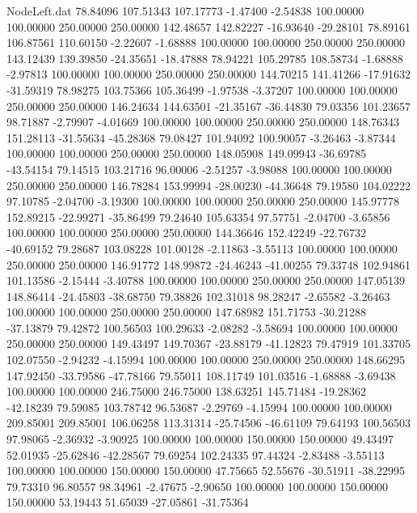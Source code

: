 \begin{filecontents}{NodeLeft.dat}
  78.84096  107.51343  107.17773    -1.47400   -2.54838  100.00000  100.00000  250.00000  250.00000  142.48657  142.82227  -16.93640  -29.28101
  78.89161  106.87561  110.60150    -2.22607   -1.68888  100.00000  100.00000  250.00000  250.00000  143.12439  139.39850  -24.35651  -18.47888
  78.94221  105.29785  108.58734    -1.68888   -2.97813  100.00000  100.00000  250.00000  250.00000  144.70215  141.41266  -17.91632  -31.59319
  78.98275  103.75366  105.36499    -1.97538   -3.37207  100.00000  100.00000  250.00000  250.00000  146.24634  144.63501  -21.35167  -36.44830
  79.03356  101.23657   98.71887    -2.79907   -4.01669  100.00000  100.00000  250.00000  250.00000  148.76343  151.28113  -31.55634  -45.28368
  79.08427  101.94092  100.90057    -3.26463   -3.87344  100.00000  100.00000  250.00000  250.00000  148.05908  149.09943  -36.69785  -43.54154
  79.14515  103.21716   96.00006    -2.51257   -3.98088  100.00000  100.00000  250.00000  250.00000  146.78284  153.99994  -28.00230  -44.36648
  79.19580  104.02222   97.10785    -2.04700   -3.19300  100.00000  100.00000  250.00000  250.00000  145.97778  152.89215  -22.99271  -35.86499
  79.24640  105.63354   97.57751    -2.04700   -3.65856  100.00000  100.00000  250.00000  250.00000  144.36646  152.42249  -22.76732  -40.69152
  79.28687  103.08228  101.00128    -2.11863   -3.55113  100.00000  100.00000  250.00000  250.00000  146.91772  148.99872  -24.46243  -41.00255
  79.33748  102.94861  101.13586    -2.15444   -3.40788  100.00000  100.00000  250.00000  250.00000  147.05139  148.86414  -24.45803  -38.68750
  79.38826  102.31018   98.28247    -2.65582   -3.26463  100.00000  100.00000  250.00000  250.00000  147.68982  151.71753  -30.21288  -37.13879
  79.42872  100.56503  100.29633    -2.08282   -3.58694  100.00000  100.00000  250.00000  250.00000  149.43497  149.70367  -23.88179  -41.12823
  79.47919  101.33705  102.07550    -2.94232   -4.15994  100.00000  100.00000  250.00000  250.00000  148.66295  147.92450  -33.79586  -47.78166
  79.55011  108.11749  101.03516    -1.68888   -3.69438  100.00000  100.00000  246.75000  246.75000  138.63251  145.71484  -19.28362  -42.18239
  79.59085  103.78742   96.53687    -2.29769   -4.15994  100.00000  100.00000  209.85001  209.85001  106.06258  113.31314  -25.74506  -46.61109
  79.64193  100.56503   97.98065    -2.36932   -3.90925  100.00000  100.00000  150.00000  150.00000   49.43497   52.01935  -25.62846  -42.28567
  79.69254  102.24335   97.44324    -2.83488   -3.55113  100.00000  100.00000  150.00000  150.00000   47.75665   52.55676  -30.51911  -38.22995
  79.73310   96.80557   98.34961    -2.47675   -2.90650  100.00000  100.00000  150.00000  150.00000   53.19443   51.65039  -27.05861  -31.75364

\end{filecontents}
